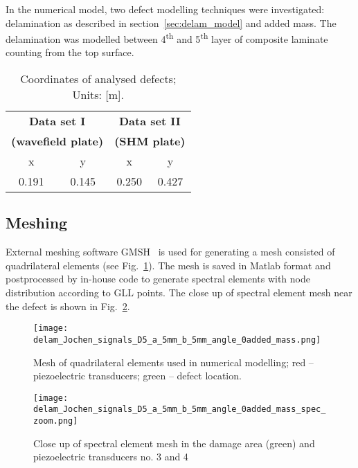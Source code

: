 \documentclass[preprint,12pt]{elsarticle}
\begin{document}
	In the numerical model, two defect modelling techniques were investigated: delamination as described in section~\ref{sec:delam_model} and added mass. The delamination was modelled between 4\textsuperscript{th} and 5\textsuperscript{th} layer of composite laminate counting from the top surface.
	\begin{table}
		\renewcommand{\arraystretch}{1.3}
		\centering \footnotesize
		\caption{Coordinates of analysed defects; Units: [m].}
		\begin{tabular}{cccc} 
			\toprule
			\multicolumn{2}{c}{\textbf{Data set I} }	& \multicolumn{2}{c}{\textbf{Data set II} } \\
			\multicolumn{2}{c}{\textbf{(wavefield plate)} }	& \multicolumn{2}{c}{\textbf{(SHM plate)} } \\
			\cmidrule(lr){1-2} \cmidrule(lr){3-4}
			x & y &  x &  y  \\
			0.191 & 0.145 & 0.250  & 0.427 \\ 
			\bottomrule 
		\end{tabular} 
		\label{tab:defect_coordinates}
	\end{table}		
	\subsection{Meshing}
	External meshing software GMSH~\cite{Geuzaine2009} is used for generating a mesh consisted of quadrilateral elements (see Fig.~\ref{fig:quad_mesh}). The mesh is saved in Matlab format and postprocessed by in-house code to generate spectral elements with node distribution according to GLL points. The close up of spectral element mesh near the defect is shown in Fig.~\ref{fig:spec_mesh_zoom}. 
	\begin{figure} [h!]
		\centering
		\texttt{[image: delam\_Jochen\_signals\_D5\_a\_5mm\_b\_5mm\_angle\_0added\_mass.png]}	
		\caption{Mesh of quadrilateral elements used in numerical modelling; red -- piezoelectric transducers; green -- defect location.}
		\label{fig:quad_mesh}
	\end{figure}
   \begin{figure} [h!]
   	\centering
   	\texttt{[image: delam\_Jochen\_signals\_D5\_a\_5mm\_b\_5mm\_angle\_0added\_mass\_spec\_zoom.png]}	
   	\caption{Close up of spectral element mesh in the damage area (green) and piezoelectric transducers no. 3 and 4}
   	\label{fig:spec_mesh_zoom}
   \end{figure}
   \clearpage
	
\end{document}
